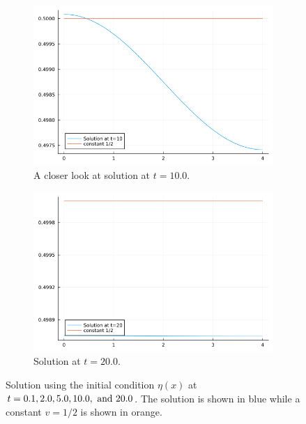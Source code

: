 \documentclass[12pt]{report}
\begin{document}
\begin{solution}
\begin{figure}[H]
\begin{subfigure}[b]{0.45\linewidth}
            \includegraphics[width=\linewidth]{images/3-5.png}
            \caption{A closer look at solution at $t=10.0$.}
            \label{3sol:e}
            \vspace{4ex}
        \end{subfigure}
        \begin{subfigure}[b]{0.45\linewidth}
            \centering
            \includegraphics[width=\linewidth]{images/3-6.png}
            \caption{Solution at $t=20.0$.}
            \label{3sol:f}
            \vspace{4ex}
        \end{subfigure}
        \caption{Solution using the initial condition $\eta(x)$ at $t=0.1,2.0,5.0,10.0, {~\text{and}~} 20.0$. The solution is shown in blue while a constant $v=1/2$ is shown in orange.}
        \label{3sol}
    \end{figure}
\end{solution}
\end{document}
